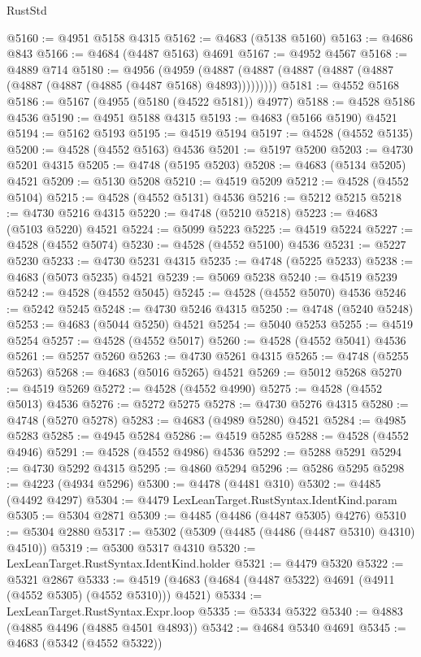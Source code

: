 \begin{lexlean}{RustStd}
\begin{coremodule}
@5160 := @4951 @5158 @4315
@5162 := @4683 (@5138 @5160)
@5163 := @4686 @843
@5166 := @4684 (@4487 @5163) @4691
@5167 := @4952 @4567
@5168 := @4889 @714
@5180 := @4956
    (@4959 (@4887 (@4887 (@4887 (@4887 (@4887 (@4887 (@4887 (@4885 (@4487 @5168) @4893)))))))))
@5181 := @4552 @5168
@5186 := @5167 (@4955 (@5180 (@4522 @5181)) @4977)
@5188 := @4528 @5186 @4536
@5190 := @4951 @5188 @4315
@5193 := @4683 (@5166 @5190) @4521
@5194 := @5162 @5193
@5195 := @4519 @5194
@5197 := @4528 (@4552 @5135)
@5200 := @4528 (@4552 @5163) @4536
@5201 := @5197 @5200
@5203 := @4730 @5201 @4315
@5205 := @4748 (@5195 @5203)
@5208 := @4683 (@5134 @5205) @4521
@5209 := @5130 @5208
@5210 := @4519 @5209
@5212 := @4528 (@4552 @5104)
@5215 := @4528 (@4552 @5131) @4536
@5216 := @5212 @5215
@5218 := @4730 @5216 @4315
@5220 := @4748 (@5210 @5218)
@5223 := @4683 (@5103 @5220) @4521
@5224 := @5099 @5223
@5225 := @4519 @5224
@5227 := @4528 (@4552 @5074)
@5230 := @4528 (@4552 @5100) @4536
@5231 := @5227 @5230
@5233 := @4730 @5231 @4315
@5235 := @4748 (@5225 @5233)
@5238 := @4683 (@5073 @5235) @4521
@5239 := @5069 @5238
@5240 := @4519 @5239
@5242 := @4528 (@4552 @5045)
@5245 := @4528 (@4552 @5070) @4536
@5246 := @5242 @5245
@5248 := @4730 @5246 @4315
@5250 := @4748 (@5240 @5248)
@5253 := @4683 (@5044 @5250) @4521
@5254 := @5040 @5253
@5255 := @4519 @5254
@5257 := @4528 (@4552 @5017)
@5260 := @4528 (@4552 @5041) @4536
@5261 := @5257 @5260
@5263 := @4730 @5261 @4315
@5265 := @4748 (@5255 @5263)
@5268 := @4683 (@5016 @5265) @4521
@5269 := @5012 @5268
@5270 := @4519 @5269
@5272 := @4528 (@4552 @4990)
@5275 := @4528 (@4552 @5013) @4536
@5276 := @5272 @5275
@5278 := @4730 @5276 @4315
@5280 := @4748 (@5270 @5278)
@5283 := @4683 (@4989 @5280) @4521
@5284 := @4985 @5283
@5285 := @4945 @5284
@5286 := @4519 @5285
@5288 := @4528 (@4552 @4946)
@5291 := @4528 (@4552 @4986) @4536
@5292 := @5288 @5291
@5294 := @4730 @5292 @4315
@5295 := @4860 @5294
@5296 := @5286 @5295
@5298 := @4223 (@4934 @5296)
@5300 := @4478 (@4481 @310)
@5302 := @4485 (@4492 @4297)
@5304 := @4479 LexLeanTarget.RustSyntax.IdentKind.param
@5305 := @5304 @2871
@5309 := @4485 (@4486 (@4487 @5305) @4276)
@5310 := @5304 @2880
@5317 := @5302 (@5309 (@4485 (@4486 (@4487 @5310) @4310) @4510))
@5319 := @5300 @5317 @4310
@5320 := LexLeanTarget.RustSyntax.IdentKind.holder
@5321 := @4479 @5320
@5322 := @5321 @2867
@5333 := @4519 (@4683 (@4684 (@4487 @5322) @4691 (@4911 (@4552 @5305) (@4552 @5310))) @4521)
@5334 := LexLeanTarget.RustSyntax.Expr.loop
@5335 := @5334 @5322
@5340 := @4883 (@4885 @4496 (@4885 @4501 @4893))
@5342 := @4684 @5340 @4691
@5345 := @4683 (@5342 (@4552 @5322))

\end{coremodule}
\end{lexlean}
